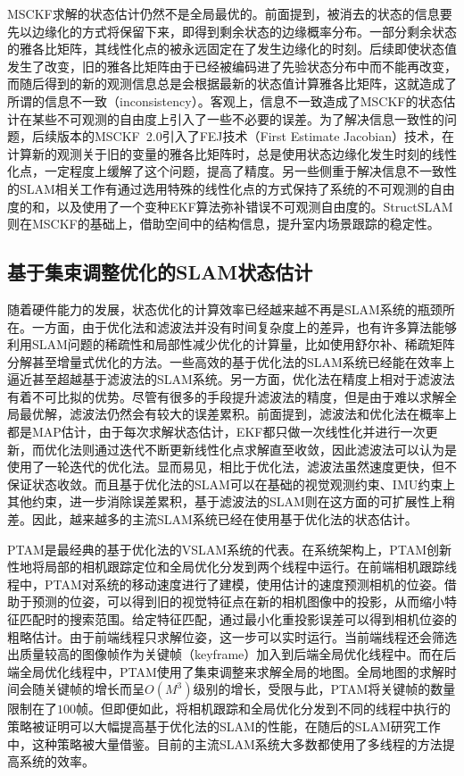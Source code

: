 MSCKF求解的状态估计仍然不是全局最优的。前面提到，被消去的状态的信息要先以边缘化的方式将保留下来，即得到剩余状态的边缘概率分布。一部分剩余状态的雅各比矩阵，其线性化点的被永远固定在了发生边缘化的时刻。后续即使状态值发生了改变，旧的雅各比矩阵由于已经被编码进了先验状态分布中而不能再改变，而随后得到的新的观测信息总是会根据最新的状态值计算雅各比矩阵，这就造成了所谓的信息不一致（inconsistency）。客观上，信息不一致造成了MSCKF的状态估计在某些不可观测的自由度上引入了一些不必要的误差。为了解决信息一致性的问题，后续版本的MSCKF~2.0\citep{li2012improving}引入了FEJ技术（First Estimate Jacobian）技术\citep{huang2008analysis}，在计算新的观测关于旧的变量的雅各比矩阵时，总是使用状态边缘化发生时刻的线性化点，一定程度上缓解了这个问题，提高了精度。另一些侧重于解决信息不一致性的SLAM相关工作有通过选用特殊的线性化点的方式保持了系统的不可观测的自由度的和，以及使用了一个变种EKF算法弥补错误不可观测自由度的。StructSLAM\citep{zhou2015structslam}则在MSCKF的基础上，借助空间中的结构信息，提升室内场景跟踪的稳定性。

\subsection{基于集束调整优化的SLAM状态估计}

随着硬件能力的发展，状态优化的计算效率已经越来越不再是SLAM系统的瓶颈所在。一方面，由于优化法和滤波法并没有时间复杂度上的差异，也有许多算法能够利用SLAM问题的稀疏性和局部性减少优化的计算量，比如使用舒尔补、稀疏矩阵分解甚至增量式优化的方法。一些高效的基于优化法的SLAM系统已经能在效率上逼近甚至超越基于滤波法的SLAM系统。另一方面，优化法在精度上相对于滤波法有着不可比拟的优势。尽管有很多的手段提升滤波法的精度，但是由于难以求解全局最优解，滤波法仍然会有较大的误差累积。前面提到，滤波法和优化法在概率上都是MAP估计，由于每次求解状态估计，EKF都只做一次线性化并进行一次更新，而优化法则通过迭代不断更新线性化点求解直至收敛，因此滤波法可以认为是使用了一轮迭代的优化法。显而易见，相比于优化法，滤波法虽然速度更快，但不保证状态收敛。而且基于优化法的SLAM可以在基础的视觉观测约束、IMU约束上其他约束，进一步消除误差累积，基于滤波法的SLAM则在这方面的可扩展性上稍差。因此，越来越多的主流SLAM系统已经在使用基于优化法的状态估计。

PTAM\citep{klein2007parallel}是最经典的基于优化法的VSLAM系统的代表。在系统架构上，PTAM创新性地将局部的相机跟踪定位和全局优化分发到两个线程中运行。在前端相机跟踪线程中，PTAM对系统的移动速度进行了建模，使用估计的速度预测相机的位姿。借助于预测的位姿，可以得到旧的视觉特征点在新的相机图像中的投影，从而缩小特征匹配时的搜索范围。给定特征匹配，通过最小化重投影误差可以得到相机位姿的粗略估计。由于前端线程只求解位姿，这一步可以实时运行。当前端线程还会筛选出质量较高的图像帧作为关键帧（keyframe）加入到后端全局优化线程中。而在后端全局优化线程中，PTAM使用了集束调整来求解全局的地图。全局地图的求解时间会随关键帧的增长而呈$O(M^3)$级别的增长，受限与此，PTAM将关键帧的数量限制在了$100$帧。但即便如此，将相机跟踪和全局优化分发到不同的线程中执行的策略被证明可以大幅提高基于优化法的SLAM的性能，在随后的SLAM研究工作中，这种策略被大量借鉴。目前的主流SLAM系统大多数都使用了多线程的方法提高系统的效率。

